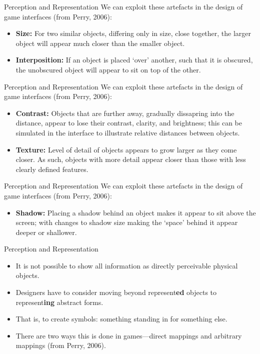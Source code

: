 \begin{frame}{Perception and Representation}
	We can exploit these artefacts in the design of game interfaces (from Perry, 2006):

	\begin{itemize}
		\item \textbf{Size:} For two similar objects, differing only in size, close together, the larger object will appear much closer than the smaller object. \pause
		\item \textbf{Interposition:} If an object is placed `over' another, such that it is obscured, the unobscured object will appear to sit on top of the other.
	\end{itemize}
\end{frame}

\begin{frame}{Perception and Representation}
	We can exploit these artefacts in the design of game interfaces (from Perry, 2006):

	\begin{itemize}
		\item \textbf{Contrast:} Objects that are further away, gradually dissapring into the distance, appear to lose their contrast, clarity, and brightness; this
		can be simulated in the interface to illustrate relative distances between objects. \pause
		\item \textbf{Texture:} Level of detail of objects appears to grow larger as they come closer. As such, objects with more detail appear closer than those
		with less clearly defined features.
	\end{itemize}
\end{frame}

\begin{frame}{Perception and Representation}
	We can exploit these artefacts in the design of game interfaces (from Perry, 2006):

	\begin{itemize}
		\item \textbf{Shadow:} Placing a shadow behind an object makes it appear to sit above the screen; with changes to shadow size making the `space' behind
		it appear deeper or shallower.
	\end{itemize}
\end{frame}

\begin{frame}{Perception and Representation}
	\begin{itemize}
		\item It is not possible to show all information as directly perceivable physical objects. 
		\item Designers have to consider moving beyond represent\textbf{ed} objects to represent\textbf{ing} abstract forms.
		\item That is, to create symbols: something standing in for something else.
		\item There are two ways this is done in games---direct mappings and arbitrary mappings (from Perry, 2006).
	\end{itemize}
\end{frame}

